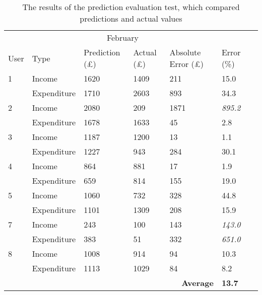 \begin{table}[h]
\centering
\begin{tabular}{@{}lllllll@{}}
\toprule
     &             &  \multicolumn{2}{c}{February} & & \\
User & Type        & Prediction (£) &  Actual (£) & Absolute Error (£)                      & Error (\%)               \\ \midrule
1    & Income      & 1620                & 1409            & 211                                  & 15.0           \\
     & Expenditure & 1710                & 2603            & 893                                  & 34.3           \\
2    & Income      & 2080                & 209             & 1871                                 & \textit{895.2} \\
     & Expenditure & 1678                & 1633            & 45                                   & 2.8            \\
3    & Income      & 1187                & 1200            & 13                                   & 1.1            \\
     & Expenditure & 1227                & 943             & 284                                  & 30.1           \\
4    & Income      & 864                 & 881             & 17                                   & 1.9            \\
     & Expenditure & 659                 & 814             & 155                                  & 19.0           \\
5    & Income      & 1060                & 732             & 328                                  & 44.8           \\
     & Expenditure & 1101                & 1309            & 208                                  & 15.9           \\
7    & Income      & 243                 & 100             & 143                                  & \textit{143.0} \\
     & Expenditure & 383                 & 51              & 332                                  & \textit{651.0} \\
8    & Income      & 1008                & 914             & 94                                   & 10.3           \\
     & Expenditure & 1113                & 1029            & 84                                   & 8.2            \\
     &             &                     &                 & \multicolumn{1}{r}{\textbf{Average}} & \textbf{13.7}
\end{tabular}
\caption{The results of the prediction evaluation test, which compared predictions and actual values }
\label{tab:rawtestingdata}
\end{table}


